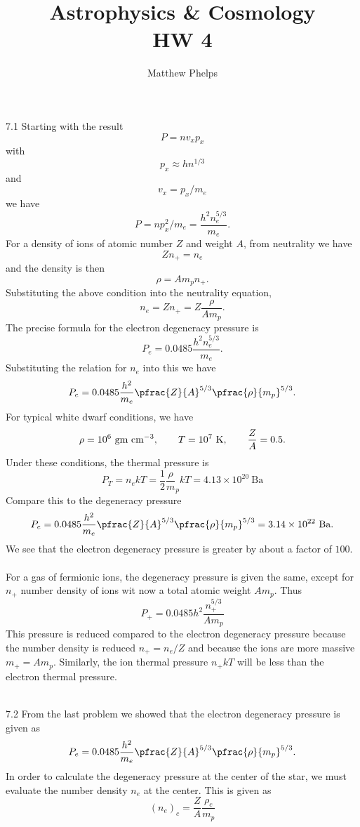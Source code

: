 \documentclass[10pt,letterpaper]{article}
\title{Astrophysics \& Cosmology\\HW 4}
\author{Matthew Phelps}
\date{}
\begin{document}
\maketitle

\benum

\item[7.1]
Starting with the result 
\[
	P = nv_xp_x
\]
with
\[
	p_x \approx hn^{1/3}
\]
and
\[
	v_x = p_x/m_e
\]
we have
\[
	P = np_x^2/m_e = \frac{h^2 n_e^{5/3}}{m_e}.
\]
For a density of ions of atomic number $Z$ and weight $A$, from neutrality we have
\[
	Zn_+ = n_e
\]
and the density is then
\[
	\rho = Am_p n_+.
\]
Substituting the above condition into the neutrality equation,
\[
	n_e=Zn_+ = Z\frac{ \rho}{Am_p}.
\]
The precise formula for the electron degeneracy pressure is
\[
	P_e =0.0485 \frac{h^2n_e^{5/3}}{m_e}.
\]
Substituting the relation for $n_e$ into this we have
\[
	P_e = 0.0485 \frac{h^2}{m_e} \pfrac{Z}{A}^{5/3} \pfrac{\rho}{m_p}^{5/3}.
\]
For typical white dwarf conditions, we have 
\[
	\rho = 10^6\ \text{gm cm}^{-3},\qquad T = 10^7\ \text K,\qquad \frac{Z}{A} = 0.5.
\]
Under these conditions, the thermal pressure is
\[
	P_T = n_e kT = \frac12 \frac\rho m_p kT = 4.13\times10^{20}\ \text{Ba}
\]
Compare this to the degeneracy pressure 
\[
	P_e = 0.0485 \frac{h^2}{m_e} \pfrac{Z}{A}^{5/3} \pfrac{\rho}{m_p}^{5/3} = 3.14\times 10^{22}\ \text{Ba}.
\]
We see that the electron degeneracy pressure is greater by about a factor of $100$. 
\\ \\
For a gas of fermionic ions, the degeneracy pressure is given the same, except for $n_+$ number density of ions wit now a total atomic weight $Am_p$. Thus
\[
	P_+ = 0.0485 h^2 \frac{n_+^{5/3}}{Am_p}
\]
This pressure is reduced compared to the electron degeneracy pressure because the number density is reduced $n_+ = n_e/Z$ and because the ions are more massive $m_+ = Am_p$. 
Similarly, the ion thermal pressure $n_+ kT$ will be less than the electron thermal pressure.
\\ \\
\item[7.2]
From the last problem we showed that the electron degeneracy pressure is given as
\[
	P_e = 0.0485 \frac{h^2}{m_e} \pfrac{Z}{A}^{5/3} \pfrac{\rho}{m_p}^{5/3}.
\]
In order to calculate the degeneracy pressure at the center of the star, we must evaluate the number density $n_e$ at the center. This is given as
\[
	(n_e)_c = \frac{Z}{A} \frac{\rho_c}{m_p}
\]
\end{document}
